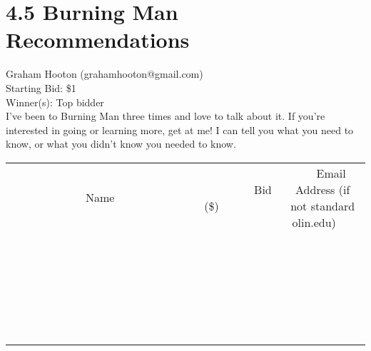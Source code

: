 \documentclass[11pt]{article}
\begin{document}
\section*{4.5 Burning Man Recommendations}
Graham Hooton (grahamhooton@gmail.com) \\
Starting Bid: \$1 \\
Winner(s): 
Top bidder \\
I've been to Burning Man three times and love to talk about it. If you're interested in going or learning more, get at me! I can tell you what you need to know, or what you didn't know you needed to know. \\[6ex]
\begin{tabular}{c c c}
~~~~~~~~~~~~~Name~~~~~~~~~~~~~ & ~~~~~~~~~Bid (\$)~~~~~~~~~ & ~~~Email Address (if not standard olin.edu)~~~ \\
 & & \\
\hline
 & & \\
\hline
 & & \\
\hline
 & & \\
\hline
 & & \\
\hline
 & & \\
\hline
 & & \\
\hline
 & & \\
\hline
 & & \\
\hline
 & & \\
\hline
 & & \\
\hline
 & & \\
\hline
 & & \\
\hline
 & & \\
\hline
 & & \\
\hline
 & & \\
\hline
 & & \\
\hline
 & & \\
\hline
 & & \\
\hline
 & & \\
\hline
 & & \\
\hline
 & & \\
\hline
 & & \\
\hline
 & & \\
\hline
 & & \\
\hline
 & & \\
\hline
\end{tabular}
\clearpage
\end{document}
